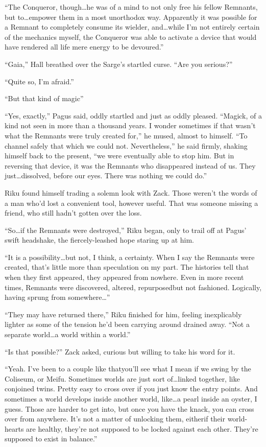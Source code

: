 ``The Conqueror, though\ldots he was of a mind to not only free his fellow Remnants, but to\ldots empower them in a most unorthodox way. Apparently it was possible for a Remnant to completely consume its wielder, and\ldots while I'm not entirely certain of the mechanics myself, the Conqueror was able to activate a device that would have rendered all life mere energy to be devoured.''

``Gaia,'' Hall breathed over the Sarge's startled curse. ``Are you serious?''

``Quite so, I'm afraid.''

``But that kind of magic\textemdash''

``Yes, exactly,'' Pagus said, oddly startled and just as oddly pleased. ``Magick, of a kind not seen in more than a thousand years. I wonder sometimes if that wasn't what the Remnants were truly created for,'' he mused, almost to himself. ``To channel safely that which we could not. Nevertheless,'' he said firmly, shaking himself back to the present, ``we were eventually able to stop him. But in reversing that device, it was the Remnants who disappeared instead of us. They just\ldots dissolved, before our eyes. There was nothing we could do.''

Riku found himself trading a solemn look with Zack. Those weren't the words of a man who'd lost a convenient tool, however useful. That was someone missing a friend, who still hadn't gotten over the loss.

``So\ldots if the Remnants were destroyed,'' Riku began, only to trail off at Pagus' swift headshake, the fiercely-leashed hope staring up at him.

``It is a possibility\ldots but not, I think, a certainty. When I say the Remnants were created, that's little more than speculation on my part. The histories tell that when they first appeared, they appeared from nowhere. Even in more recent times, Remnants were discovered, altered, repurposed\textemdash but not fashioned. Logically, having sprung from somewhere\ldots''

``They may have returned there,'' Riku finished for him, feeling inexplicably lighter as some of the tension he'd been carrying around drained away. ``Not a separate world\ldots a world within a world.''

``Is that possible?'' Zack asked, curious but willing to take his word for it.

``Yeah. I've been to a couple like that\textemdash you'll see what I mean if we swing by the Coliseum, or Meifu. Sometimes worlds are just sort of\ldots linked together, like conjoined twins. Pretty easy to cross over if you just know the entry points. And sometimes a world develops inside another world, like\ldots a pearl inside an oyster, I guess. Those are harder to get into, but once you have the knack, you can cross over from anywhere. It's not a matter of unlocking them, either\textemdash if their world-hearts are healthy, they're not supposed to be locked against each other. They're supposed to exist in balance.''


